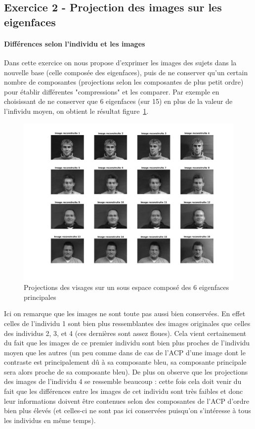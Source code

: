 \documentclass{article}
\begin{document}
\subsection{Exercice 2 - Projection des images sur les eigenfaces}
\paragraph{Différences selon l'individu et les images}
Dans cette exercice on nous propose d'exprimer les images des sujets dans la nouvelle base (celle composée des eigenfaces), puis de ne conserver qu'un certain nombre de composantes (projections selon les composantes de plus petit ordre) pour établir différentes "compressions" et les comparer. Par exemple en choisissant de ne conserver que 6 eigenfaces (sur 15) en plus de la valeur de l'infividu moyen, on obtient le résultat figure~\ref{proj_faces}.
\begin{figure}[!ht]
    \begin{center}
        \includegraphics[width=0.9\linewidth]{images/2-proj6.png}
        \caption{Projections des visages sur un sous espace composé des 6 eigenfaces principales}
        \label{proj_faces}
    \end{center}
\end{figure}
Ici on remarque que les images ne sont toute pas aussi bien conservées. En effet celles de l'individu 1 sont bien plus ressemblantes des images originales que celles des individus 2, 3, et 4 (ces dernières sont assez floues). Cela vient certainement du fait que les images de ce premier individu sont bien plus proches de l'individu moyen que les autres (un peu comme dans de cas de l'ACP d'une image dont le contraste est principalement dû à sa composante bleu, sa composante principale sera alors proche de sa composante bleu). De plus on observe que les projections des images de l'individu 4 se ressemble beaucoup : cette fois cela doit venir du fait que les différences entre les images de cet individu sont très faibles et donc leur informations doivent être contenues selon des composantes de l'ACP d'ordre bien plus élevés (et celles-ci ne sont pas ici conservées puisqu'on s'intéresse à tous les individus en même temps).
\end{document}
